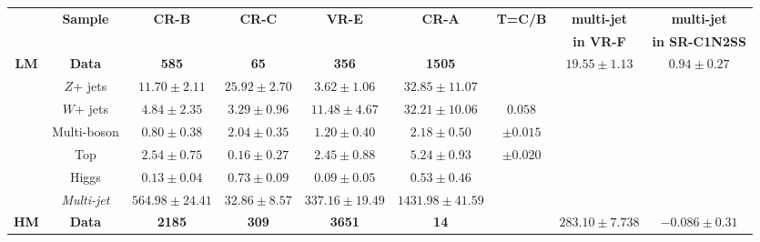 \begin{table}
\centering {\tiny{}}%
\begin{tabular}{|c|c|c|c|c|c|c|c|c|}
\hline 
\multirow{2}{*}{} & \multirow{2}{*}{\textbf{\tiny{}Sample }} & \multirow{2}{*}{\textbf{\tiny{}CR-B }} & \multirow{2}{*}{\textbf{\tiny{}CR-C }} & \multirow{2}{*}{\textbf{\tiny{}VR-E }} & \multirow{2}{*}{\textbf{\tiny{}CR-A }} & \multirow{2}{*}{\textbf{\tiny{}T=C/B}{\tiny{} }} & \textbf{\tiny{}multi-jet } & \textbf{\tiny{}multi-jet }\tabularnewline
 &  &  &  &  &  &  & \textbf{\tiny{}in VR-F } & \textbf{\tiny{}in SR-C1N2SS}\tabularnewline
\hline 
\hline 
\multirow{7}{*}{\textbf{\tiny{}LM}} & \textbf{\tiny{}Data}{\tiny{} } & \textbf{\tiny{}585}{\tiny{} } & \textbf{\tiny{}65}{\tiny{} } & \textbf{\tiny{}356}{\tiny{} } & \textbf{\tiny{}1505}{\tiny{} } & \multirow{2}{*}{} & \multirow{7}{*}{{\tiny{}$19.55\pm1.13$}} & \multirow{7}{*}{{\tiny{}$0.94\pm0.27$}}\tabularnewline
\cline{2-6} \cline{3-6} \cline{4-6} \cline{5-6} \cline{6-6} 
 & {\tiny{}$Z$+ jets } & {\tiny{}$11.70\pm2.11$ } & {\tiny{}$25.92\pm2.70$ } & {\tiny{}$3.62\pm1.06$ } & {\tiny{}$32.85\pm11.07$ } &  &  & \tabularnewline
\cline{2-6} \cline{3-6} \cline{4-6} \cline{5-6} \cline{6-6} 
 & {\tiny{}$W$+ jets } & {\tiny{}$4.84\pm2.35$ } & {\tiny{}$3.29\pm0.96$ } & {\tiny{}$11.48\pm4.67$ } & {\tiny{}$32.21\pm10.06$ } & {\tiny{}$0.058$ } &  & \tabularnewline
\cline{2-6} \cline{3-6} \cline{4-6} \cline{5-6} \cline{6-6} 
 & {\tiny{}Multi-boson } & {\tiny{}$0.80\pm0.38$ } & {\tiny{}$2.04\pm0.35$ } & {\tiny{}$1.20\pm0.40$ } & {\tiny{}$2.18\pm0.50$ } & {\tiny{}$\pm0.015$ } &  & \tabularnewline
\cline{2-6} \cline{3-6} \cline{4-6} \cline{5-6} \cline{6-6} 
 & {\tiny{}Top } & {\tiny{}$2.54\pm0.75$ } & {\tiny{}$0.16\pm0.27$ } & {\tiny{}$2.45\pm0.88$ } & {\tiny{}$5.24\pm0.93$ } & {\tiny{}$\pm0.020$ } &  & \tabularnewline
\cline{2-6} \cline{3-6} \cline{4-6} \cline{5-6} \cline{6-6} 
 & {\tiny{}Higgs } & {\tiny{}$0.13\pm0.04$ } & {\tiny{}$0.73\pm0.09$ } & {\tiny{}$0.09\pm0.05$ } & {\tiny{}$0.53\pm0.46$ } & \multirow{2}{*}{} &  & \tabularnewline
\cline{2-6} \cline{3-6} \cline{4-6} \cline{5-6} \cline{6-6} 
 & \emph{\tiny{}Multi-jet}{\tiny{} } & {\tiny{}$564.98\pm24.41$ } & {\tiny{}$32.86\pm8.57$ } & {\tiny{}$337.16\pm19.49$ } & {\tiny{}$1431.98\pm41.59$ } &  &  & \tabularnewline
\hline 
\multirow{7}{*}{\textbf{\tiny{}HM}} & \textbf{\tiny{}Data}{\tiny{} } & \textbf{\tiny{}2185}{\tiny{} } & \textbf{\tiny{}309}{\tiny{} } & \textbf{\tiny{}3651}{\tiny{} } & \textbf{\tiny{}14}{\tiny{} } & \multirow{2}{*}{} & \multirow{7}{*}{{\tiny{}$283.10\pm7.738$}} & \multirow{7}{*}{{\tiny{}$-0.086\pm0.31$}}\tabularnewline

\end{tabular}
\end{table}
